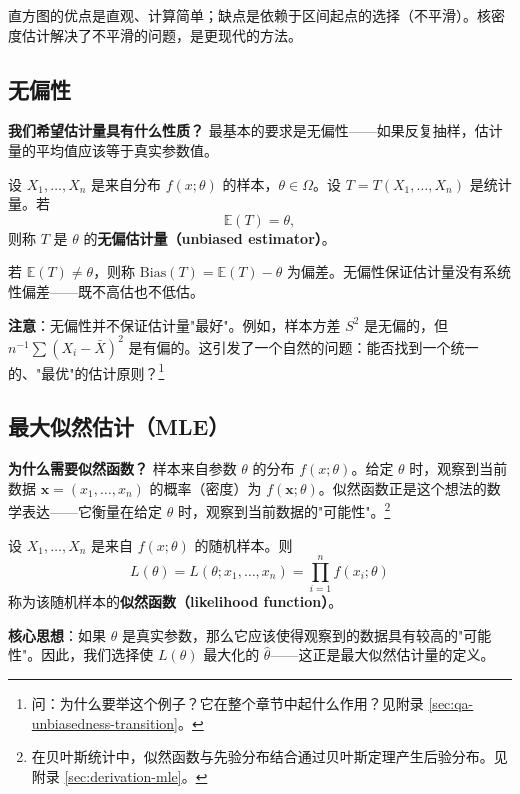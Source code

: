 直方图的优点是直观、计算简单；缺点是依赖于区间起点的选择（不平滑）。核密度估计解决了不平滑的问题，是更现代的方法。

\subsection{无偏性}

\textbf{我们希望估计量具有什么性质？} 最基本的要求是无偏性——如果反复抽样，估计量的平均值应该等于真实参数值。

\begin{definition}[无偏估计量]\label{def:unbiased-estimator}
设 $X_1, \ldots, X_n$ 是来自分布 $f(x;\theta)$ 的样本，$\theta \in \Omega$。设 $T = T(X_1, \ldots, X_n)$ 是统计量。若
\[
\mathbb{E}(T) = \theta,
\]
则称 $T$ 是 $\theta$ 的\textbf{无偏估计量（unbiased estimator）}。
\end{definition}

若 $\mathbb{E}(T) \neq \theta$，则称 $\mathrm{Bias}(T) = \mathbb{E}(T) - \theta$ 为偏差。无偏性保证估计量没有系统性偏差——既不高估也不低估。

\textbf{注意}：无偏性并不保证估计量"最好"。例如，样本方差 $S^2$ 是无偏的，但 $n^{-1}\sum(X_i - \bar{X})^2$ 是有偏的。这引发了一个自然的问题：能否找到一个统一的、"最优"的估计原则？\footnote{问：为什么要举这个例子？它在整个章节中起什么作用？见附录 \cref{sec:qa-unbiasedness-transition}。}

\subsection{最大似然估计（MLE）}

\textbf{为什么需要似然函数？} 样本来自参数 $\theta$ 的分布 $f(x;\theta)$。给定 $\theta$ 时，观察到当前数据 $\mathbf{x} = (x_1, \ldots, x_n)$ 的概率（密度）为 $f(\mathbf{x}; \theta)$。似然函数正是这个想法的数学表达——它衡量在给定 $\theta$ 时，观察到当前数据的"可能性"。\footnote{在贝叶斯统计中，似然函数与先验分布结合通过贝叶斯定理产生后验分布。见附录 \cref{sec:derivation-mle}。}

\begin{definition}[似然函数]\label{def:likelihood-function-ch4}
设 $X_1, \ldots, X_n$ 是来自 $f(x;\theta)$ 的随机样本。则
\[
L(\theta) = L(\theta; x_1, \ldots, x_n) = \prod_{i=1}^n f(x_i; \theta)
\]
称为该随机样本的\textbf{似然函数（likelihood function）}。
\end{definition}

\textbf{核心思想}：如果 $\theta$ 是真实参数，那么它应该使得观察到的数据具有较高的"可能性"。因此，我们选择使 $L(\theta)$ 最大化的 $\widehat{\theta}$——这正是最大似然估计量的定义。

